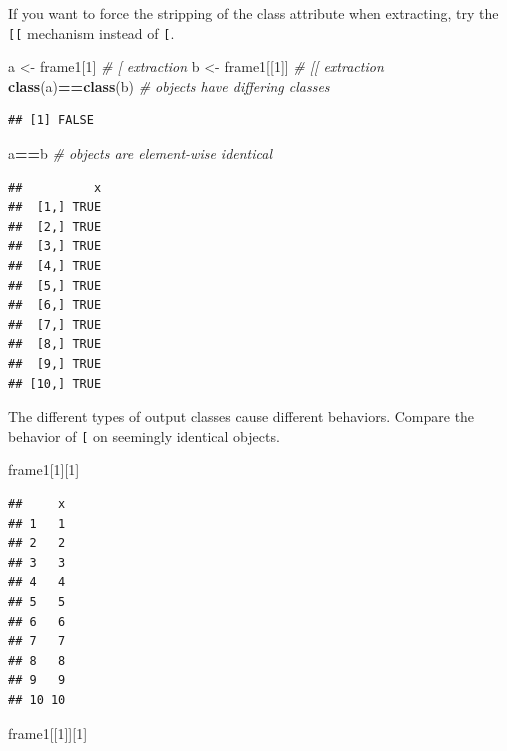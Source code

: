 \documentclass[]{book}
\newenvironment{Shaded}{\begin{snugshade}}{\end{snugshade}}
\newcommand{\KeywordTok}[1]{\textcolor[rgb]{0.13,0.29,0.53}{\textbf{#1}}}
\newcommand{\DecValTok}[1]{\textcolor[rgb]{0.00,0.00,0.81}{#1}}
\newcommand{\StringTok}[1]{\textcolor[rgb]{0.31,0.60,0.02}{#1}}
\newcommand{\CommentTok}[1]{\textcolor[rgb]{0.56,0.35,0.01}{\textit{#1}}}
\newcommand{\OperatorTok}[1]{\textcolor[rgb]{0.81,0.36,0.00}{\textbf{#1}}}
\newcommand{\NormalTok}[1]{#1}
\theoremstyle{definition}
\theoremstyle{definition}
\theoremstyle{definition}
\theoremstyle{remark}
\begin{document}
If you want to force the stripping of the class attribute when
extracting, try the \texttt{{[}{[}} mechanism instead of \texttt{{[}}.

\begin{Shaded}
\begin{Highlighting}[]
\NormalTok{a <-}\StringTok{ }\NormalTok{frame1[}\DecValTok{1}\NormalTok{] }\CommentTok{# [ extraction}
\NormalTok{b <-}\StringTok{ }\NormalTok{frame1[[}\DecValTok{1}\NormalTok{]] }\CommentTok{# [[ extraction}
\KeywordTok{class}\NormalTok{(a)}\OperatorTok{==}\KeywordTok{class}\NormalTok{(b) }\CommentTok{# objects have differing classes}
\end{Highlighting}
\end{Shaded}

\begin{verbatim}
## [1] FALSE
\end{verbatim}

\begin{Shaded}
\begin{Highlighting}[]
\NormalTok{a}\OperatorTok{==}\NormalTok{b }\CommentTok{# objects are element-wise identical }
\end{Highlighting}
\end{Shaded}

\begin{verbatim}
##          x
##  [1,] TRUE
##  [2,] TRUE
##  [3,] TRUE
##  [4,] TRUE
##  [5,] TRUE
##  [6,] TRUE
##  [7,] TRUE
##  [8,] TRUE
##  [9,] TRUE
## [10,] TRUE
\end{verbatim}

The different types of output classes cause different behaviors. Compare
the behavior of \texttt{{[}} on seemingly identical objects.

\begin{Shaded}
\begin{Highlighting}[]
\NormalTok{frame1[}\DecValTok{1}\NormalTok{][}\DecValTok{1}\NormalTok{]}
\end{Highlighting}
\end{Shaded}

\begin{verbatim}
##     x
## 1   1
## 2   2
## 3   3
## 4   4
## 5   5
## 6   6
## 7   7
## 8   8
## 9   9
## 10 10
\end{verbatim}

\begin{Shaded}
\begin{Highlighting}[]
\NormalTok{frame1[[}\DecValTok{1}\NormalTok{]][}\DecValTok{1}\NormalTok{]}
\end{Highlighting}
\end{Shaded}
\end{document}
